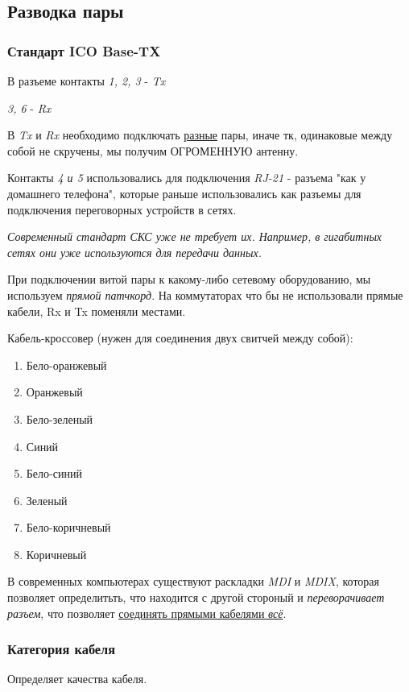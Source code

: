 \documentclass[a4paper,10pt]{article}
\begin{document}
	\subsection{Разводка пары}
	\subsubsection{Стандарт ICO Base-TX}
	В разъеме контакты \emph{1, 2, 3} - \emph{Tx}
	
	\emph{3, 6} - \emph{Rx}
	
	В \emph{Tx} и \emph{Rx} необходимо подключать \underline{разные} пары, иначе тк, одинаковые между собой не скручены, мы получим ОГРОМЕННУЮ антенну.
	
	Контакты \emph{4 и 5} использовались для подключения \emph{RJ-21} - разъема "как у домашнего телефона", которые раньше использовались как разъемы для подключения переговорных устройств в сетях.
	
	\textit{Современный стандарт \emph{СКС} уже не требует их. Например, в гигабитных сетях они уже используются для передачи данных.}
	
	При подключении витой пары к какому-либо сетевому оборудованию, мы используем \emph{прямой патчкорд}.
	На коммутаторах что бы не использовали прямые кабели, Rx и Tx поменяли местами.
	
	Кабель-кроссовер (нужен для соединения двух свитчей между собой):
		\begin{enumerate}
		\item Бело-оранжевый
		\item Оранжевый
		\item Бело-зеленый
		\item Синий
		\item Бело-синий
		\item Зеленый
		\item Бело-коричневый
		\item Коричневый
	\end{enumerate}

	В современных компьютерах существуют раскладки \emph{MDI} и \emph{MDIX}, которая позволяет определитьть, что находится с другой стороный и \emph{переворачивает разъем}, что позволяет \underline{соединять прямыми кабелями \emph{всё}}.
	
	\subsubsection{Категория кабеля}
	Определяет качества кабеля.
	
\end{document}
